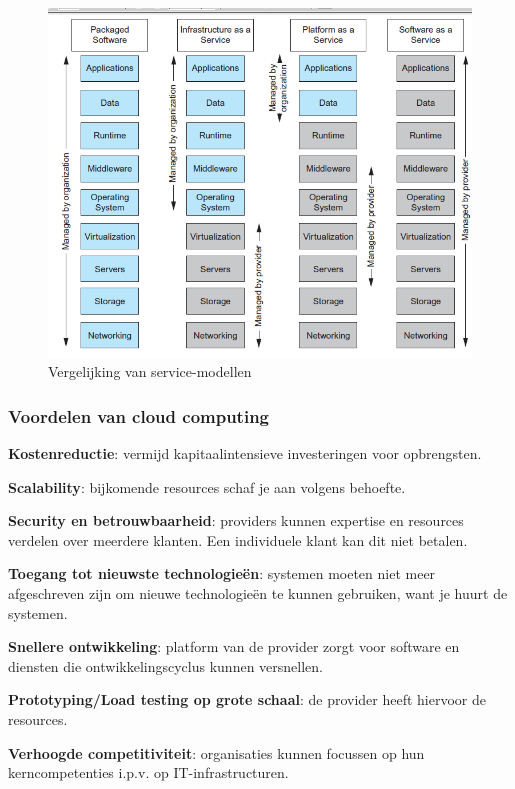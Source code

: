 \documentclass[a4paper,12pt]{article}
\begin{document}
\begin{figure}[H]
\includegraphics[scale=1]{./img/VergelijkingServiceModellen}
\caption{Vergelijking van service-modellen}
\label{fig:VergelijkingServiceModellen}
\end{figure}

\subsubsection{Voordelen van cloud computing}
\textbf{Kostenreductie}: vermijd kapitaalintensieve investeringen voor opbrengsten.

\textbf{Scalability}: bijkomende resources schaf je aan volgens behoefte.

\textbf{Security en betrouwbaarheid}: providers kunnen expertise en resources verdelen over meerdere klanten.
Een individuele klant kan dit niet betalen.

\textbf{Toegang tot nieuwste technologieën}: systemen moeten niet meer afgeschreven zijn om nieuwe technologieën te kunnen gebruiken, want je huurt de systemen.

\textbf{Snellere ontwikkeling}: platform van de provider zorgt voor software en diensten die ontwikkelingscyclus kunnen versnellen.

\textbf{Prototyping/Load testing op grote schaal}: de provider heeft hiervoor de resources.

\textbf{Verhoogde competitiviteit}: organisaties kunnen focussen op hun kerncompetenties i.p.v. op IT-infrastructuren.
\end{document}
